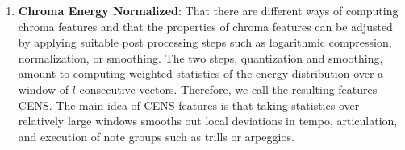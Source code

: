 \documentclass[conference]{IEEEtran}
\begin{document}
\begin{enumerate}
\begin{enumerate}
        \item\textbf{Chroma Energy Normalized}: That there are different ways of computing chroma features and that the properties of chroma features can be adjusted by applying suitable post processing steps such as logarithmic compression, normalization, or smoothing. The two steps, quantization and smoothing, amount to computing weighted statistics of the energy distribution over a window of $l$ consecutive vectors. Therefore, we call the resulting features CENS. The main idea of CENS features is that taking statistics over relatively large windows smooths out local deviations in tempo, articulation, and execution of note groups such as trills or arpeggios.\cite{cens}
    \end{enumerate}
\end{enumerate}
\end{document}
